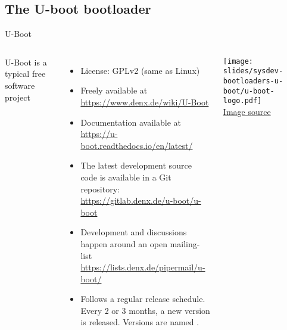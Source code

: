 \subsection{The U-boot bootloader}

\begin{frame}{U-Boot}
  \begin{columns}[T]
      U-Boot is a typical free software project
      \begin{itemize}
      \item License: GPLv2 (same as Linux)
      \item Freely available at \url{https://www.denx.de/wiki/U-Boot}
      \item Documentation available at
        \url{https://u-boot.readthedocs.io/en/latest/}
      \item The latest development source code is available in a Git
        repository:
        \url{https://gitlab.denx.de/u-boot/u-boot}
      \item Development and discussions happen around an open mailing-list
        \url{https://lists.denx.de/pipermail/u-boot/}
      \item Follows a regular release schedule. Every 2 or 3 months,
        a new version is released. Versions are named .
      \end{itemize}
    \texttt{[image: slides/sysdev-bootloaders-u-boot/u-boot-logo.pdf]}\\
    {\tiny \href{https://en.wikipedia.org/wiki/Das_U-Boot\#/media/File:U-Boot_Logo.svg}{Image source}}
  \end{columns}
\end{frame}


